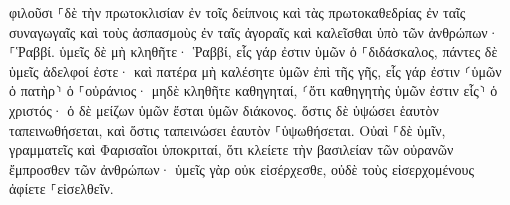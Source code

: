 \documentclass{openreader}
\begin{document}
φιλοῦσι ⸀δὲ τὴν πρωτοκλισίαν ἐν τοῖς δείπνοις καὶ τὰς πρωτοκαθεδρίας ἐν ταῖς συναγωγαῖς 
καὶ τοὺς ἀσπασμοὺς ἐν ταῖς ἀγοραῖς καὶ καλεῖσθαι ὑπὸ τῶν ἀνθρώπων· ⸀Ῥαββί. 
ὑμεῖς δὲ μὴ κληθῆτε· Ῥαββί, εἷς γάρ ἐστιν ὑμῶν ὁ ⸀διδάσκαλος, πάντες δὲ ὑμεῖς ἀδελφοί ἐστε· 
καὶ πατέρα μὴ καλέσητε ὑμῶν ἐπὶ τῆς γῆς, εἷς γάρ ἐστιν ⸂ὑμῶν ὁ πατὴρ⸃ ὁ ⸀οὐράνιος· 
μηδὲ κληθῆτε καθηγηταί, ⸂ὅτι καθηγητὴς ὑμῶν ἐστιν εἷς⸃ ὁ χριστός· 
ὁ δὲ μείζων ὑμῶν ἔσται ὑμῶν διάκονος. 
ὅστις δὲ ὑψώσει ἑαυτὸν ταπεινωθήσεται, καὶ ὅστις ταπεινώσει ἑαυτὸν ⸀ὑψωθήσεται. 
Οὐαὶ ⸀δὲ ὑμῖν, γραμματεῖς καὶ Φαρισαῖοι ὑποκριταί, ὅτι κλείετε τὴν βασιλείαν τῶν οὐρανῶν ἔμπροσθεν τῶν ἀνθρώπων· ὑμεῖς γὰρ οὐκ εἰσέρχεσθε, οὐδὲ τοὺς εἰσερχομένους ἀφίετε ⸀εἰσελθεῖν. 
\end{document}
